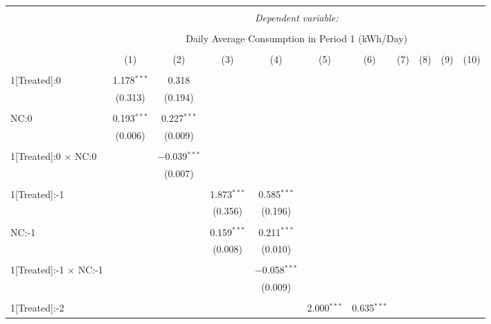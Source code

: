 
\begin{table}[!htbp] \centering 
  \caption{} 
  \label{} 
\footnotesize 
\begin{tabular}{@{\extracolsep{5pt}}lcccccccccc} 
\\[-1.8ex]\hline 
\hline \\[-1.8ex] 
 & \multicolumn{10}{c}{\textit{Dependent variable:}} \\ 
\cline{2-11} 
\\[-1.8ex] & \multicolumn{10}{c}{Daily Average Consumption in Period 1 (kWh/Day)} \\ 
\\[-1.8ex] & (1) & (2) & (3) & (4) & (5) & (6) & (7) & (8) & (9) & (10)\\ 
\hline \\[-1.8ex] 
 1[Treated]:0 & 1.178$^{***}$ & 0.318 &  &  &  &  &  &  &  &  \\ 
  & (0.313) & (0.194) &  &  &  &  &  &  &  &  \\ 
  & & & & & & & & & & \\ 
 NC:0 & 0.193$^{***}$ & 0.227$^{***}$ &  &  &  &  &  &  &  &  \\ 
  & (0.006) & (0.009) &  &  &  &  &  &  &  &  \\ 
  & & & & & & & & & & \\ 
 1[Treated]:0 $\times$ NC:0 &  & $-$0.039$^{***}$ &  &  &  &  &  &  &  &  \\ 
  &  & (0.007) &  &  &  &  &  &  &  &  \\ 
  & & & & & & & & & & \\ 
 1[Treated]:-1 &  &  & 1.873$^{***}$ & 0.585$^{***}$ &  &  &  &  &  &  \\ 
  &  &  & (0.356) & (0.196) &  &  &  &  &  &  \\ 
  & & & & & & & & & & \\ 
 NC:-1 &  &  & 0.159$^{***}$ & 0.211$^{***}$ &  &  &  &  &  &  \\ 
  &  &  & (0.008) & (0.010) &  &  &  &  &  &  \\ 
  & & & & & & & & & & \\ 
 1[Treated]:-1 $\times$ NC:-1 &  &  &  & $-$0.058$^{***}$ &  &  &  &  &  &  \\ 
  &  &  &  & (0.009) &  &  &  &  &  &  \\ 
  & & & & & & & & & & \\ 
 1[Treated]:-2 &  &  &  &  & 2.000$^{***}$ & 0.635$^{***}$ &  &  &  &  \\ 

\end{tabular}
\end{table}
